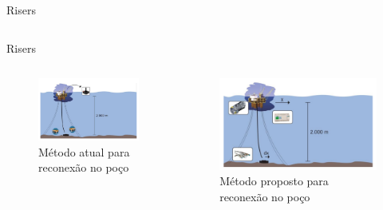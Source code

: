 \documentclass[10pt]{beamer}
\begin{document}
\begin{frame}[fragile]{Risers}
\begin{columns}[T]
\begin{column}{.5\textwidth}
\end{column}%
\end{columns}

\end{frame}
\begin{frame}[fragile]{Risers}
  \begin{columns}[T] %
\begin{column}{.5\textwidth}

\begin{figure}[!ht]
\centering
\includegraphics[width=1\linewidth]{figures/introducao/posicionamentoAtual}
\caption{Método atual para reconexão no poço\cite{redytton}}
\end{figure}


\end{column}%
\hfill%
\begin{column}{.5\textwidth}

\begin{figure}[!ht]
\centering
\includegraphics[width=1\linewidth]{figures/introducao/posicionamentoProposto}
\caption{Método proposto para reconexão no poço\cite{redytton}}
\end{figure}

\end{column}%
\end{columns}

\end{frame}
\end{document}
